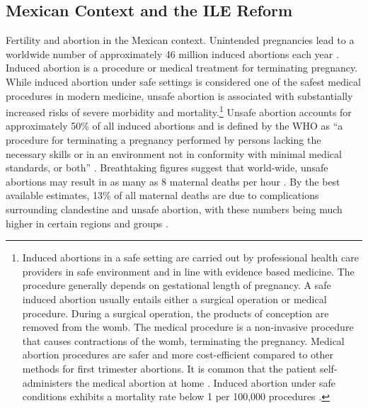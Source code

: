 \documentclass[a4paper,11pt]{article}
\begin{document}
\begin{spacing}{1.5}
\section{Mexican Context and the ILE Reform}
\label{reform}
Fertility and abortion in the Mexican context. Unintended pregnancies lead to a worldwide number of approximately 46 million induced abortions each year \citep{van2005world}. Induced abortion is a procedure or medical treatment for terminating pregnancy. While induced abortion under safe settings is considered one of the safest medical procedures in modern medicine, unsafe abortion is associated with substantially increased risks of severe morbidity and mortality.\footnote{Induced abortions in a safe setting are carried out by professional health care providers in safe environment and in line with evidence based medicine. The procedure generally depends on gestational length of pregnancy. A safe induced abortion usually entails either a surgical operation or medical procedure. During a surgical operation, the products of conception are removed from the womb. The medical procedure is a non-invasive procedure that causes contractions of the womb, terminating the pregnancy. Medical abortion procedures are safer and more cost-efficient compared to other methods for first trimester abortions. It is common that the patient self-administers the medical abortion at home \citep{kulier2007medical}. Induced abortion under safe conditions exhibits a mortality rate below 1 per 100,000 procedures \citep{grimes2005risks}. } Unsafe abortion accounts for approximately 50\% of all induced abortions \citep{van2005world} and is defined by the WHO as ``a procedure for terminating a pregnancy performed by persons lacking the necessary skills or in an environment not in conformity with minimal medical standards, or both'' \citep{ganatra2014concept}. Breathtaking figures suggest that world-wide, unsafe abortions may result in as many as 8 maternal deaths per hour \citep{TheLancet2009}.  By the best available estimates, 13\% of all maternal deaths are due to complications surrounding clandestine and unsafe abortion, with these numbers being much higher in certain regions and groups \citep{WHO2011}.


\end{spacing}
\end{document}

